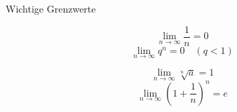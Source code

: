 \begin{highlight}{Wichtige Grenzwerte}
    \begin{center}
        \begin{minipage}{0.45\linewidth}
            $$\lim _{n \rightarrow \infty} \frac{1}{n}=0$$
            $$\lim _{n \rightarrow \infty} q^n=0 \quad(q<1)$$
        \end{minipage}
        \hfill\vline\hfill
        \begin{minipage}{0.45\linewidth}
            $$\lim _{n \rightarrow \infty} \sqrt[n]{a}=1$$
            $$\lim _{n \rightarrow \infty}\left(1+\frac{1}{n}\right)^n=e$$
        \end{minipage}
    \end{center}
\end{highlight}

